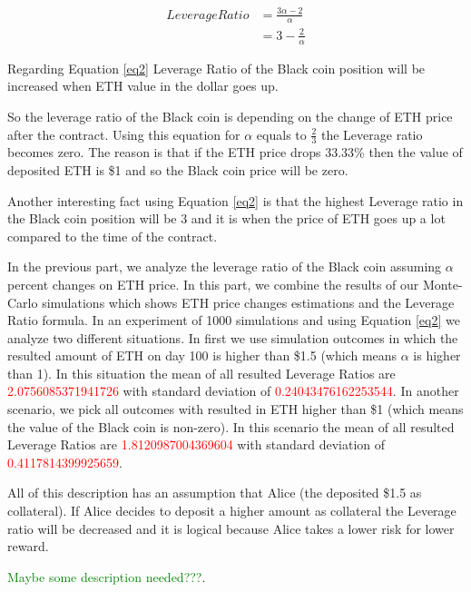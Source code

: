 \begin{equation} \label{eq2}
\begin{split}
Leverage Ratio & = \frac{3\alpha - 2}{\alpha} \\
 & = 3- \frac{2}{\alpha}
\end{split}
\end{equation}

Regarding Equation \ref{eq2} Leverage Ratio of the Black coin position will be increased when ETH value in the dollar goes up.

So the leverage ratio of the Black coin is depending on the change of ETH price after the contract. Using this equation for $\alpha$ equals to $\frac{2}{3} $ the Leverage ratio becomes zero. The reason is that if the ETH price drops 33.33\% then the value of deposited ETH is \$1 and so the Black coin price will be zero. 

Another interesting fact using Equation \ref{eq2} is that the highest Leverage ratio in the Black coin position will be 3 and it is when the price of ETH goes up a lot compared to the time of the contract.

In the previous part, we analyze the leverage ratio of the Black coin assuming $\alpha$ percent changes on ETH price. In this part, we combine the results of our Monte-Carlo simulations which shows ETH price changes estimations and the Leverage Ratio formula. 
In an experiment of 1000 simulations and using Equation \ref{eq2} we analyze two different situations. In first we use simulation outcomes in which the resulted amount of ETH on day 100 is higher than \$1.5 (which means $\alpha$ is higher than 1). In this situation the mean of all resulted Leverage Ratios are \textcolor{red}{2.0756085371941726} with standard deviation of \textcolor{red}{0.24043476162253544}. In another scenario, we pick all outcomes with resulted in ETH higher than \$1 (which means the value of the Black coin is non-zero). In this scenario  the mean of all resulted Leverage Ratios are \textcolor{red}{1.8120987004369604} with standard deviation of \textcolor{red}{0.4117814399925659}.

All of this description has an assumption that Alice (the deposited \$1.5 as collateral). If Alice decides to deposit a higher amount as collateral the Leverage ratio will be decreased and it is logical because Alice takes a lower risk for lower reward.

\textcolor{green}{Maybe some description needed???}.

